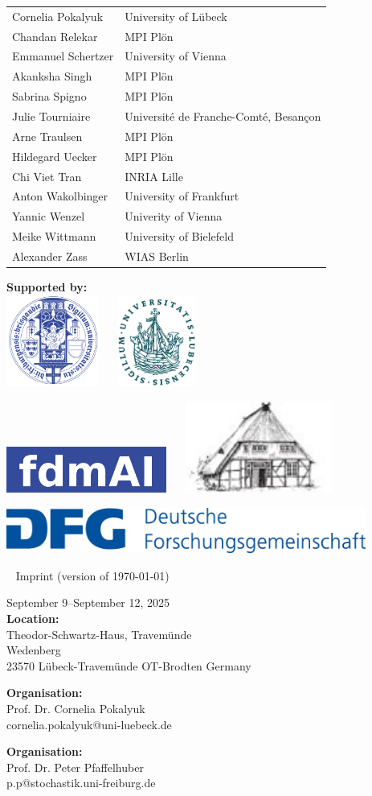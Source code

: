 \documentclass[12pt,a4paper]{article}
\makeatletter
\newcommand{\Impressum}{%
{\scriptsize
\fboxsep0pt
{\begin{minipage}[b]{.33\textwidth}
September 9--September 12, 2025\\[.5ex]
\textbf{Location: }\\
Theodor-Schwartz-Haus, Travemünde\\
Wedenberg \\
23570 Lübeck-Travemünde OT-Brodten
Germany
\end{minipage}}
\hfill
{\begin{minipage}[b]{.36\textwidth}
\textbf{Organisation: }\\
Prof. Dr. Cornelia Pokalyuk \\
cornelia.pokalyuk@uni-luebeck.de  
\end{minipage}}%
\hfill
{\begin{minipage}[b]{.28\textwidth}
\textbf{Organisation: }\\
Prof. Dr. Peter Pfaffelhuber\\
p.p@stochastik.uni-freiburg.de
\end{minipage}} 
}}
\makeatother
\begin{document}
\begin{longtable}{L{0.3\textwidth}R{0.7\textwidth}}
Cornelia Pokalyuk & University of Lübeck \\
Chandan Relekar & MPI Plön \\
Emmanuel Schertzer & University of Vienna \\
Akanksha Singh & MPI Plön \\
Sabrina Spigno & MPI Plön \\
Julie Tourniaire & Université de Franche-Comté, Besançon \\
Arne Traulsen & MPI Plön \\
Hildegard Uecker & MPI Plön \\
Chi Viet Tran & INRIA Lille \\
Anton Wakolbinger & University of Frankfurt \\
Yannic Wenzel & Univerity of Vienna \\
Meike Wittmann & University of Bielefeld \\
Alexander Zass & WIAS Berlin \\
\end{longtable}


\newpage


\textbf{Supported by: }\\
 
\includegraphics[height=3cm]{UFR-vorlage-designsystem-typo-farben-V1.99-768x543.png}
~\hfill ~
\includegraphics[height=3cm]{Siegel-Uni-Luebeck.svg.png}
~\hfill ~

\bigskip
\includegraphics[height=1.5cm]{fdmai.png}
~\hfill ~
\includegraphics[height=3cm]{logo-tsh.jpg}
~\hfill ~

\bigskip
\bigskip
\bigskip
\bigskip

\includegraphics[height=1.5cm]{dfg.jpg}

 ~
 \vfill
 {\scriptsize Imprint {\tiny (version of \today) }} \\[1ex]
 \Impressum
 
 \bigskip
\end{document}
